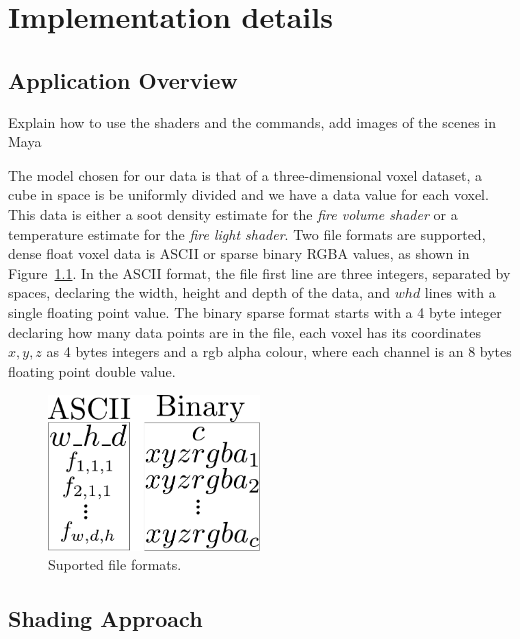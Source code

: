 \chapter{Implementation details}
\label{ch:implementation_details}


\section{Application Overview}
\label{sec:application_overview}

Explain how to use the shaders and the commands, add images of the scenes in Maya

The model chosen for our data is that of a three-dimensional voxel dataset, a cube in space is be uniformly divided and we have a data value for each voxel.
This data is either a soot density estimate for the \textit{fire volume shader} or a temperature estimate for the \textit{fire light shader}.
Two file formats are supported, dense float voxel data is ASCII or sparse binary RGBA values, as shown in Figure~\ref{fig:file_format}.
In the ASCII format, the file first line are three integers, separated by spaces, declaring the width, height and depth of the data, and $whd$ lines with a single floating point value.
The binary sparse format starts with a 4 byte integer declaring how many data points are in the file, each voxel has its coordinates $x,y,z$ as 4 bytes integers and a rgb alpha colour, where each channel is an 8 bytes floating point double value. 

\begin{figure}[htbp!]
\centering
\includegraphics[width=0.5\textwidth]{img/file_format}
	\caption{Suported file formats.}
	\label{fig:file_format}
\end{figure}


\section{\MentalRay Shading Approach}
\label{sec:mental_ray_shading_approach}

